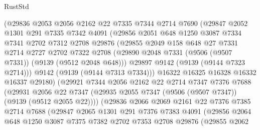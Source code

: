 \begin{lexlean}{RustStd}
\begin{coremodule}
              (@29836
                @2053
                @2056
                @2162
                @22
                @7335
                @7344
                @2714
                @7690
                (@29847
                  @2052
                  @1301
                  @291
                  @7335
                  @7342
                  @4091
                  (@29856
                    @2051
                    @648
                    @1250
                    @3087
                    @7334
                    @7341
                    @2702
                    @7312
                    @2708
                    @29876
                    (@29855
                      @2049
                      @158
                      @648
                      @27
                      @7331
                      @2714
                      @2727
                      @2702
                      @7322
                      @2708
                      (@29890 @2048 @7331 (@9506 (@9507 @7331)) (@9139 (@9512 @2048 @648)))
                      @29897
                      @9142
                      (@9139 (@9144 @7323 @2714)))
                    @9142
                    (@9139 (@9144 @7313 @7334)))
                  @16322
                  @16325
                  @16328
                  @16332
                  @16337
                  @29180)
                (@29921
                  @7344
                  @2056
                  @2162
                  @22
                  @2714
                  @7347
                  @7376
                  @7688
                  (@29931
                    @2056
                    @22
                    @7347
                    (@29935 @2055 @7347 (@9506 (@9507 @7347)) (@9139 (@9512 @2055 @22))))
                  (@29836
                    @2066
                    @2069
                    @2161
                    @22
                    @7376
                    @7385
                    @2714
                    @7688
                    (@29847
                      @2065
                      @1301
                      @291
                      @7376
                      @7383
                      @4091
                      (@29856
                        @2064
                        @648
                        @1250
                        @3087
                        @7375
                        @7382
                        @2702
                        @7353
                        @2708
                        @29876
                        (@29855
                          @2062

\end{coremodule}
\end{lexlean}
